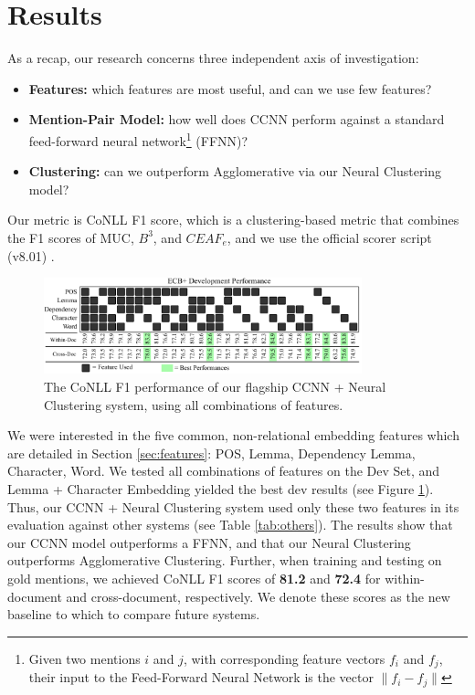 \documentclass[11pt,a4paper]{article}
\begin{document}
\section{Results}
As a recap, our research concerns three independent axis of investigation:
\begin{itemize}
\item \textbf{Features:} which features are most useful, and can we use few features?
\item \textbf{Mention-Pair Model:} how well does CCNN perform against a standard feed-forward neural network\footnote{Given two mentions $i$ and $j$, with corresponding feature vectors $f_i$ and $f_j$, their input to the Feed-Forward Neural Network is the vector $\|f_{i} - f_{j}\|$} (FFNN)?
\item \textbf{Clustering:} can we outperform Agglomerative via our Neural Clustering model?
\end{itemize}

Our metric is CoNLL F1 score, which is a clustering-based metric that combines the F1 scores of MUC, $B^{3}$, and $CEAF_{e}$, and we use the official scorer script (v8.01) \cite{Pradhan+etal:14a}.

\begin{figure}[h]
\centering
	\includegraphics[width=0.82\textwidth]{features.pdf}
	\caption{The CoNLL F1 performance of our flagship CCNN + Neural Clustering system, using all combinations of features.}
	\label{fig:allfeatures}
\end{figure}

We were interested in the five common, non-relational embedding features which are detailed in Section \ref{sec:features}: POS, Lemma, Dependency Lemma, Character, Word.  We tested all combinations of features on the Dev Set, and Lemma + Character Embedding yielded the best dev results (see Figure \ref{fig:allfeatures}).  Thus, our CCNN + Neural Clustering system used only these two features in its evaluation against other systems (see Table \ref{tab:others}).  The results show that our CCNN model outperforms a FFNN, and that our Neural Clustering outperforms Agglomerative Clustering.  Further, when training and testing on gold mentions, we achieved CoNLL F1 scores of \textbf{81.2} and \textbf{72.4} for within-document and cross-document, respectively.  We denote these scores as the new baseline to which to compare future systems.
\end{document}
